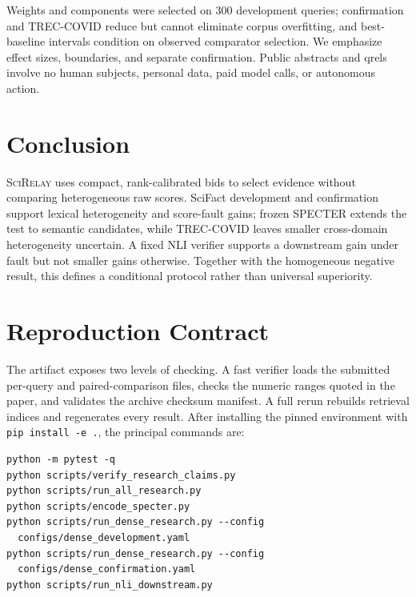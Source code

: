 \documentclass[sigconf]{acmart}
\newcommand{\method}{\textsc{SciRelay}}
\begin{document}
Weights and components were selected on 300 development queries; confirmation and TREC-COVID reduce but cannot eliminate corpus overfitting, and best-baseline intervals condition on observed comparator selection. We emphasize effect sizes, boundaries, and separate confirmation. Public abstracts and qrels involve no human subjects, personal data, paid model calls, or autonomous action.

\section{Conclusion}

\method{} uses compact, rank-calibrated bids to select evidence without comparing heterogeneous raw scores. SciFact development and confirmation support lexical heterogeneity and score-fault gains; frozen SPECTER extends the test to semantic candidates, while TREC-COVID leaves smaller cross-domain heterogeneity uncertain. A fixed NLI verifier supports a downstream gain under fault but not smaller gains otherwise. Together with the homogeneous negative result, this defines a conditional protocol rather than universal superiority.

\clearpage
\balance



\clearpage
\appendix
\raggedbottom

\section{Reproduction Contract}

The artifact exposes two levels of checking. A fast verifier loads the submitted per-query and paired-comparison files, checks the numeric ranges quoted in the paper, and validates the archive checksum manifest. A full rerun rebuilds retrieval indices and regenerates every result. After installing the pinned environment with \texttt{pip install -e .}, the principal commands are:

\begin{small}
\begin{verbatim}
python -m pytest -q
python scripts/verify_research_claims.py
python scripts/run_all_research.py
python scripts/encode_specter.py
python scripts/run_dense_research.py --config
  configs/dense_development.yaml
python scripts/run_dense_research.py --config
  configs/dense_confirmation.yaml
python scripts/run_nli_downstream.py
\end{verbatim}
\end{small}
\end{document}
